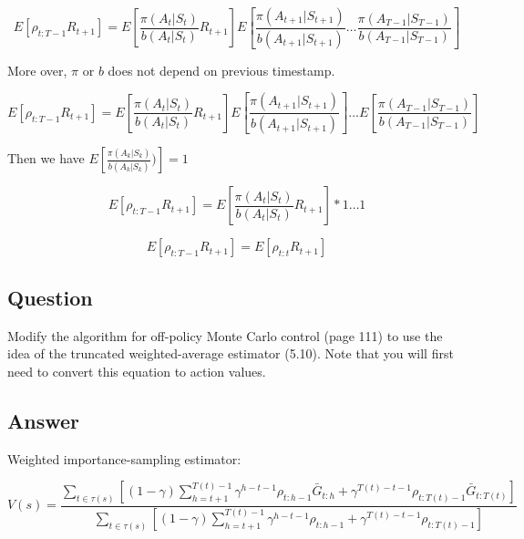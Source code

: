 \documentclass[11pt]{article}
\begin{document}
    \begin{equation}
        E[\rho_{t:T-1}R_{t+1}] = E[\frac{\pi(A_t|S_t)}{b(A_t|S_t)} R_{t+1}] E[\frac{\pi(A_{t+1}|S_{t+1})}{b(A_{t+1}|S_{t+1})} \dots \frac{\pi(A_{T-1}|S_{T-1})}{b(A_{T-1}|S_{T-1})}]
    \end{equation}

    More over, $\pi$ or $b$ does not depend on previous timestamp.

    \begin{equation}
        E[\rho_{t:T-1}R_{t+1}] = E[\frac{\pi(A_t|S_t)}{b(A_t|S_t)} R_{t+1}] E[\frac{\pi(A_{t+1}|S_{t+1})}{b(A_{t+1}|S_{t+1})}] \dots E[\frac{\pi(A_{T-1}|S_{T-1})}{b(A_{T-1}|S_{T-1})}]
    \end{equation}

    Then we have $E[\frac{ \pi( A_{k}|S_{k} )}{ b(A_{k}|S_{k})})] = 1$


    \begin{equation}
        E[\rho_{t:T-1}R_{t+1}] = E[\frac{\pi(A_t|S_t)}{b(A_t|S_t)} R_{t+1}] * 1 \dots 1
    \end{equation}

    \begin{equation}
        E[\rho_{t:T-1}R_{t+1}] = E[\rho_{t:t}R_{t+1}]
    \end{equation}

    \subsection{Question}

    Modify the algorithm for off-policy Monte Carlo control (page 111) to use the idea of the truncated weighted-average estimator (5.10).
    Note that you will first need to convert this equation to action values.

    \subsection*{Answer}

    Weighted importance-sampling estimator:

    \begin{equation}
        V(s) =  \frac{ \sum_{t \in \tau(s) } [ (1-\gamma) \sum_{h=t+1}^{T(t)-1} \gamma^{h-t-1} \rho_{t:h-1} \bar{G}_{t:h} + \gamma^{T(t)-t-1} \rho_{t:T(t)-1} \bar{G}_{t:T(t)} ]   }{ \sum_{t \in \tau(s) } [ (1-\gamma) \sum_{h=t+1}^{T(t)-1} \gamma^{h-t-1} \rho_{t:h-1} + \gamma^{T(t)-t-1} \rho_{t:T(t)-1} ]  }
    \end{equation}
\end{document}
